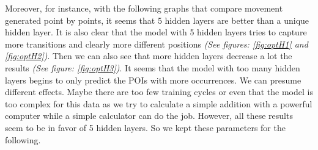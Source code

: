 \documentclass[a4]{article}
\begin{document}
Moreover, for instance, with the following graphs that compare movement generated point by points, it seems that 5 hidden layers are better than a unique hidden layer. It is also clear that the model with 5 hidden layers tries to capture more transitions and clearly more different positions \textit{(See figures: \ref{fig:optH1} and  \ref{fig:optH2})}.
Then we can also see that more hidden layers decrease a lot the results \textit{(See figure: \ref{fig:optH3})}. It seems that the model with too many hidden layers begins to only predict the POIs with more occurrences. We can presume different effects. Maybe there are too few training cycles or even that the model is too complex for this data as we try to calculate a simple addition with a powerful computer while a simple calculator can do the job.
However, all these results seem to be in favor of 5 hidden layers. So we kept these parameters for the following.
\end{document}
